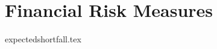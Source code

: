 \documentclass{report}
\begin{document}
	

\tableofcontents		

\part{Financial Risk Measures}

{expectedshortfall.tex}
\pagebreak
\end{document}
